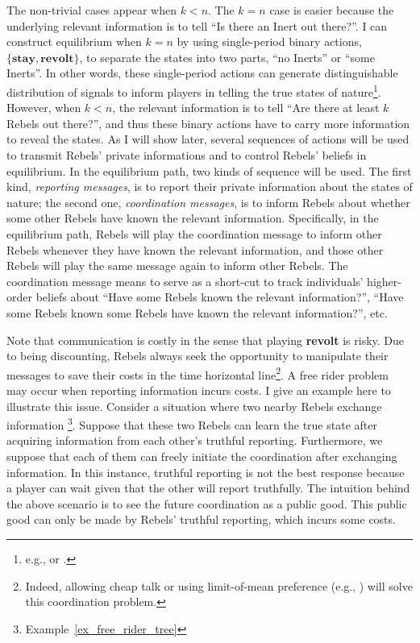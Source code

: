 \documentclass[12pt,letter]{article}
\theoremstyle{definition}
\theoremstyle{remark}
\theoremstyle{claim}
\begin{document}
The non-trivial cases appear when $k<n$. The $k=n$ case is easier because the underlying relevant information is to tell ``Is there an Inert out there?''. I can construct equilibrium when $k=n$ by using single-period binary actions, $\{\textbf{stay},\textbf{revolt}\}$, to separate the states into two parts, ``no Inerts'' or ``some Inerts''. In other words, these single-period actions can generate distinguishable distribution of signals to inform players in telling the true states of nature\footnote{e.g., \citep{Fudenberg2010} or \citep{Fudenberg2011}.}. However, when $k<n$, the relevant information is to tell ``Are there at least $k$ Rebels out there?'', and thus these binary actions have to carry more information to reveal the states. As I will show later, several sequences of actions will be used to transmit Rebels' private informations and to control Rebels' beliefs in equilibrium. In the equilibrium path, two kinds of sequence will be used. The first kind, \textit{reporting messages}, is to report their private information about the states of nature; the second one, \textit{coordination messages}, is to inform Rebels about whether some other Rebels have known the relevant information.  Specifically, in the equilibrium path, Rebels will play the coordination message to inform other Rebels whenever they have known the relevant information, and those other Rebels will play the same message again to inform other Rebels. The coordination message means to serve as a short-cut to track individuals' higher-order beliefs about ``Have some Rebels known the relevant information?'', ``Have some Rebels known some Rebels have known the relevant information?'', etc.


Note that communication is costly in the sense that playing \textbf{revolt} is risky. Due to being discounting, Rebels always seek the opportunity to manipulate their messages to save their costs in the time horizontal line\footnote{Indeed, allowing cheap talk or using limit-of-mean preference (e.g., \citep{Renault1998}) will solve this coordination problem.}. A free rider problem may occur when reporting information incurs costs. I give an example here to illustrate this issue. Consider a situation where two nearby Rebels exchange information \footnote{Example~\ref{ex_free_rider_tree}}. Suppose that these two Rebels can learn the true state after acquiring information from each other's truthful reporting. Furthermore, we suppose that each of them can freely initiate the coordination after exchanging information. In this instance, truthful reporting is not the best response because a player can wait given that the other will report truthfully. The intuition behind the above scenario is to see the future coordination as a public good. This public good can only be made by Rebels' truthful reporting, which incurs some costs.
\end{document}
